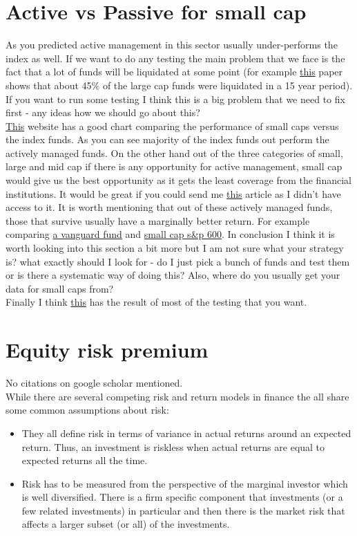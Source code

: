 \documentclass[12 pt]{article}
\begin{document}
\section{Active vs Passive for small cap}
As you predicted active management in this sector usually under-performs the index as well. If we want to do any testing the main problem that we face is the fact that a lot of funds will be liquidated at some point (for example \href{https://personal.vanguard.com/pdf/s362.pdf}{this} paper shows that about 45\% of the large cap funds were liquidated in a 15 year period). If you want to run some testing I think this is a big problem that we need to fix first - any ideas how we should go about this?\\
\href{http://www.wisdomtree.com/blog/index.php/active-management-in-small-cap-equities-no-proof-of-outperformance/}{This} website has a good chart comparing the performance of small caps versus the index funds. As you can see majority of the index funds out perform the actively managed funds. On the other hand out of the three categories of small, large and mid cap if there is any opportunity for active management, small cap would give us the best opportunity as it gets the least coverage from the financial institutions. It would be great if you could send me \href{http://www.iijournals.com/doi/abs/10.3905/joi.2013.22.2.055#sthash.hXeHnb7I.p0sb7Ay5.dpbs}{this} article as I didn't have access to it. It is worth mentioning that out of these actively managed funds, those that survive usually have a marginally better return. For example comparing \href{https://personal.vanguard.com/us/funds/snapshot?FundId=0048&FundIntExt=INT}{a vanguard fund} and \href{http://www.ishares.com/us/products/239775/ishares-sp-smallcap-600-value-etf}{small cap s\&p 600}.
In conclusion I think it is worth looking into this section a bit more but I am not sure what your strategy is? what exactly should I look for - do I just pick a bunch of funds and test them or is there a systematic way of doing this? Also, where do you usually get your data for small caps from?\\
Finally I think \href{http://www.spindices.com/documents/spiva/spiva-us-mid-year-2013.pdf}{this} has the result of most of the testing that you want. 
\section{Equity risk premium}
No citations on google scholar mentioned.\\
While there are several competing risk and return models in finance the all share some common assumptions about risk: 
\begin{itemize}
\item They all define risk in terms of variance in actual returns around an expected return. Thus, an investment is riskless when actual returns are equal to expected returns all the time. 
\item Risk has to be measured from the perspective of the marginal investor which is well diversified. There is a firm specific component that investments (or a few related investments) in particular and then there is the market risk that affects a larger subset (or all) of the investments. 
\end{itemize}
\end{document}
